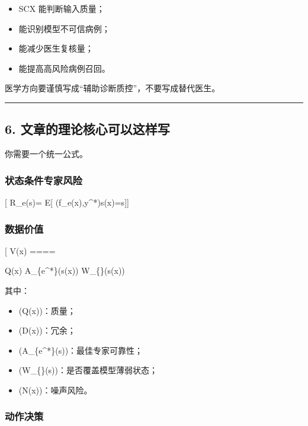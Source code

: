 \documentclass[
  12pt,
]{ctexart}
\providecommand{\tightlist}{%
  \setlength{\itemsep}{0pt}\setlength{\parskip}{0pt}}
\begin{document}
\begin{itemize}
\tightlist
\item
  SCX 能判断输入质量；
\item
  能识别模型不可信病例；
\item
  能减少医生复核量；
\item
  能提高高风险病例召回。
\end{itemize}

医学方向要谨慎写成``辅助诊断质控''，不要写成替代医生。

\begin{center}\rule{0.5\linewidth}{0.5pt}\end{center}

\subsection{6.
文章的理论核心可以这样写}\label{ux6587ux7ae0ux7684ux7406ux8bbaux6838ux5fc3ux53efux4ee5ux8fd9ux6837ux5199}

你需要一个统一公式。

\subsubsection{状态条件专家风险}\label{ux72b6ux6001ux6761ux4ef6ux4e13ux5bb6ux98ceux9669}

{[} R\_e(s)= \mathbb E{[} \ell(f\_e(x),y\^{}*)\mid s(x)=s{]}{]}

\subsubsection{数据价值}\label{ux6570ux636eux4ef7ux503c}

{[} V(x) ====

Q(x) \cdot
[1-D(x)]\cdot A\_\{e\^{}*\}(s(x)) \cdot W\_\{\}(s(x)) \cdot
[1-N(x)]{]}

其中：

\begin{itemize}
\tightlist
\item
  (Q(x))：质量；
\item
  (D(x))：冗余；
\item
  (A\_\{e\^{}*\}(s))：最佳专家可靠性；
\item
  (W\_\{\}(s))：是否覆盖模型薄弱状态；
\item
  (N(x))：噪声风险。
\end{itemize}

\subsubsection{动作决策}\label{ux52a8ux4f5cux51b3ux7b56}
\end{document}
